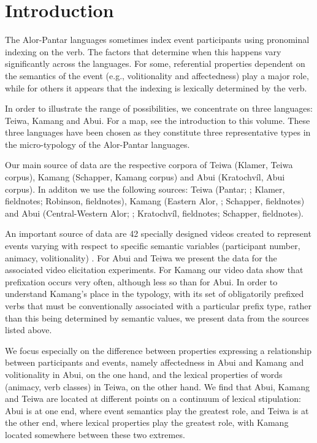 
  
\section{Introduction}
\label{sec:10:1}
\hypertarget{Toc385255248}{}The Alor-Pantar languages sometimes index event participants using pronominal indexing on the verb. The factors that determine when this happens vary significantly across the languages. For some, referential properties dependent on the semantics of the event (e.g., volitionality and affectedness) play a major role, while for others it appears that the indexing is lexically determined by the verb.

In order to illustrate the range of possibilities, we concentrate on three languages: Teiwa, Kamang and Abui. For a map, see the introduction to this volume. These three languages have been chosen as they constitute three representative types in the micro-typology of the Alor-Pantar languages. 

Our main source of data are the respective corpora of Teiwa (Klamer, Teiwa corpus), Kamang (Schapper, Kamang corpus) and Abui (Kratochv\'il, Abui corpus). In additon we use the following sources: Teiwa (Pantar; \citet{Klamer2010grammar}; Klamer, fieldnotes; Robinson, fieldnotes), Kamang (Eastern Alor, \citet{SchapperEtAl2011kamus}; Schapper, fieldnotes) and Abui (Central-Western Alor; \citet{Kratochvil2007,Kratochvil2011transitivity}; Kratochv\'il, fieldnotes; Schapper, fieldnotes).

An important source of data are 42 specially designed videos created to represent events varying with respect to specific semantic variables (participant number, animacy, volitionality) \citep[see][]{FeddenEtAl2013}. For Abui and Teiwa we present the data for the associated video elicitation experiments. For Kamang our video data show that prefixation occurs very often, although less so than for Abui. In order to understand Kamang's place in the typology, with its set of obligatorily prefixed verbs that must be conventionally associated with a particular prefix type, rather than this being determined by semantic values, we present data from the sources listed above.

We focus especially on the difference between properties expressing a relationship between participants and events, namely affectedness in Abui and Kamang and volitionality in Abui, on the one hand, and the lexical properties of words (animacy, verb classes) in Teiwa, on the other hand. We find that Abui, Kamang and Teiwa are located at different points on a continuum of lexical stipulation: Abui is at one end, where event semantics play the greatest role, and Teiwa is at the other end, where lexical properties play the greatest role, with Kamang located somewhere between these two extremes.

